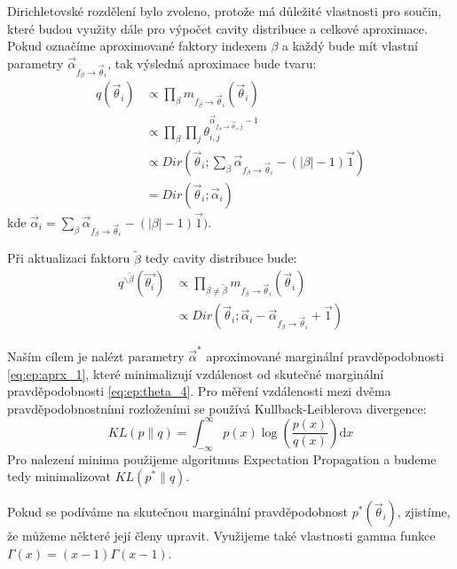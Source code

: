 Dirichletovské rozdělení bylo zvoleno, protože má důležité vlastnosti pro
součin, které budou využity dále pro výpočet cavity distribuce a celkové
aproximace. Pokud označíme aproximované faktory indexem $\beta$ a každý bude
mít vlastní parametry $\vec\alpha_{f_\beta \rightarrow \vec\theta_i}$, tak výsledná aproximace bude
tvaru:
\begin{align}
q(\vec{\theta}_i) &\propto
    \prod_\beta
    m_{f_\beta \rightarrow \vec{\theta}_i}(\vec{\theta}_i)
\\
&\propto
    \prod_\beta
        \prod_j
            \theta_{i,j}^{\vec\alpha_{f_\beta \rightarrow \vec\theta_i, j} - 1}
\\
&\propto
    Dir(\vec{\theta}_i;
        \sum_\beta \vec\alpha_{f_\beta \rightarrow \vec\theta_i} - (|\beta| - 1) \vec{1})
\\
&=
    Dir(\vec{\theta}_i;
        \vec{\alpha}_i)
\label{eq:ep:aprx_1}
\end{align}
kde $\vec{\alpha}_i = \sum_\beta \vec\alpha_{f_\beta \rightarrow \vec\theta_i} - (|\beta| - 1)
\vec{1})$.

Při aktualizaci faktoru $\tilde\beta$ tedy cavity distribuce bude:
\begin{align}
q^{\backslash \tilde\beta} (\vec{\theta_i})
&\propto
    \prod_{\beta \ne \tilde\beta}
        m_{f_\beta \rightarrow \vec{\theta}_i}(\vec{\theta}_i)
\\
& \propto
Dir(\vec{\theta}_i;
    \vec{\alpha}_i - \vec\alpha_{f_\beta \rightarrow \vec\theta_i} + \vec{1})
\end{align}

Naším cílem je nalézt parametry $\vec{\alpha}^*$ aproximované marginální
pravděpodobnosti \eqref{eq:ep:aprx_1}, které minimalizují vzdálenost od
skutečné marginální pravděpodobnosti \eqref{eq:ep:theta_4}. Pro měření
vzdálenosti mezi dvěma pravděpodobnostními rozloženími se používá
Kullback-Leiblerova divergence:
\begin{equation}
KL(p \| q) =
\int_{-\infty}^{\infty}
    p(x) \log\left(\frac{p(x)}{q(x)}\right) \mathrm{d}x
\end{equation}
Pro nalezení minima použijeme algoritmus Expectation Propagation a budeme tedy
minimalizovat $KL(p^*\| q)$.

Pokud se podíváme na skutečnou marginální pravděpodobnost
$p^*(\vec{\theta}_i)$, zjistíme, že můžeme některé její členy upravit.
Využijeme také vlastnosti gamma funkce $\Gamma(x) = (x-1) \Gamma(x-1)$.

